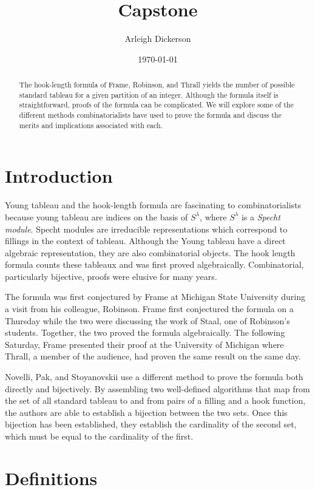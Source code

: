 \documentclass[11pt]{article}
\title{Capstone}
\author{Arleigh Dickerson}
\date{\today}
\theoremstyle{definition}
\begin{document}
\maketitle

\begin{abstract}
The hook-length formula of Frame, Robinson, and Thrall yields the number of possible standard tableau for a given partition of an integer. Although the formula itself is straightforward, proofs of the formula can be complicated. We will explore some of the different methods combinatorialists have used to prove the formula and discuss the merits and implications associated with each. 
\end{abstract}

\section{Introduction}
Young tableau and the hook-length formula are fascinating to combinatorialists because young tableau are indices on the basis of $S^\lambda$, where $S^\lambda$ is a \emph{Specht module}. Specht modules are irreducible representations which correspond to fillings in the context of tableau. Although the Young tableau have a direct algebraic representation, they are also combinatorial objects. The hook length formula counts these tableaux and was first proved algebraically. Combinatorial, particularly bijective, proofs were elusive for many years.

The formula was first conjectured by Frame\cite{Frame} at Michigan State University during a visit from his colleague, Robinson. Frame first conjectured the formula on a Thursday while the two were discussing the work of Staal, one of Robinson's students. Together, the two proved the formula algebraically. The following Saturday, Frame presented their proof at the University of Michigan where Thrall, a member of the audience, had proven the same result on the same day.

Novelli, Pak, and Stoyanovskii\cite{NPS} use a different method to prove the formula both directly and bijectively. By assembling two well-defined algorithms that map from the set of all standard tableau to and from pairs of a filling and a hook function, the authors are able to establish a bijection between the two sets. Once this bijection has been established, they establish the cardinality of the second set, which must be equal to the cardinality of the first.

\section{Definitions}
\end{document}
